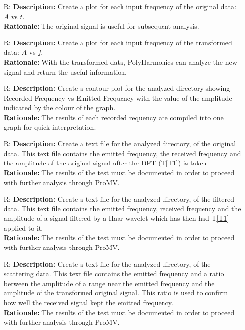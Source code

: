 \documentclass[12pt]{article}
\newcounter{reqnum} %
\newcommand{\progname}{PolyHarmonics}
\begin{document}
\begin{itemize}

\item[R\refstepcounter{reqnum}\thereqnum \label{R_Plot1}:]
\textbf{Description:} Create a plot for each input frequency of the original
 data: $A$ vs $t$.\\
\textbf{Rationale:} The original signal is useful for subsequent analysis.

\item[R\refstepcounter{reqnum}\thereqnum \label{R_Plot2}:]
\textbf{Description:} Create a plot for each input frequency of the 
transformed data: $A$ vs $f$.\\
\textbf{Rationale:} With the transformed data, \progname{} can analyze the
 new signal and return the useful information.

\item[R\refstepcounter{reqnum}\thereqnum \label{R_ContourPlot}:]
\textbf{Description:} Create a contour plot for the analyzed directory
 showing Recorded Frequency vs Emitted Frequency with the value of the
amplitude indicated by the colour of the graph.\\
\textbf{Rationale:} The results of each recorded requency are compiled
into one graph for quick interpretation.

\item[R\refstepcounter{reqnum}\thereqnum \label{R_TextOriginal}:]
\textbf{Description:} Create a text file for the analyzed directory, of 
the original data. This text file contains the emitted frequency, the received
 frequency and the amplitude of the original signal after 
the DFT (T\ref{T1}) is taken. \\
\textbf{Rationale:} The results of the test must be documented in order
to proceed with further analysis through ProMV.

\item[R\refstepcounter{reqnum}\thereqnum \label{R_TextFiltered}:]
\textbf{Description:} Create a text file for the analyzed directory, of the 
filtered data. This text file contains the emitted frequency, received 
frequency and the amplitude of a signal filtered by a Haar wavelet 
which has then had T\ref{T1} applied to it. \\
\textbf{Rationale:} The results of the test must be documented in order
to proceed with further analysis through ProMV.

\item[R\refstepcounter{reqnum}\thereqnum \label{R_TextScattered}:]
\textbf{Description:} Create a text file for the analyzed directory, of the
scattering data. This text file contains the emitted frequency and a ratio
 between the amplitude of a range near the emitted frequency and the amplitude 
 of the transformed original signal. This ratio is used to confirm how well the
received signal kept the emitted frequency. \\
\textbf{Rationale:} The results of the test must be documented in order
to proceed with further analysis through ProMV.


\end{itemize}
\end{document}
